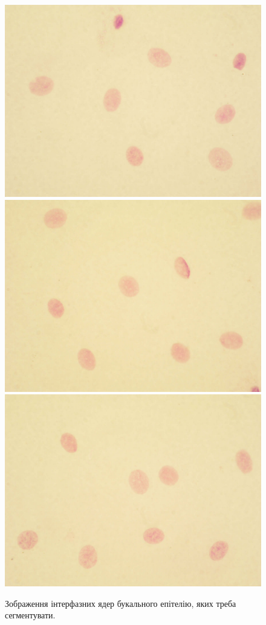 \begin{figure}[b!]
	\includegraphics[width=0.97\linewidth]{Figures/Chapter2/0a.png}
	\centering
	\endminipage\hfill
	\centering	
	\includegraphics[width=0.97\linewidth]{Figures/Chapter2/0b.png}
	\endminipage\hfill
	\centering	
	\includegraphics[width=0.97\linewidth]{Figures/Chapter2/0c.png}
	\endminipage\hfill
	
	\caption{Зображення інтерфазних ядер букального епітелію, яких треба сегментувати.}
	\label{fig:raw_cells}
\end{figure}

